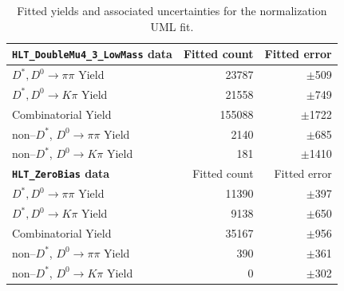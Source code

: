 \begin{table}[h!]
    \centering
    \begin{tabular}{@{}lrr@{}}
    \toprule
    \toprule
    \textbf{\texttt{HLT\_DoubleMu4\_3\_LowMass} data}& Fitted count & Fitted error  \\
    \midrule
    $D^*, D^0 \to \pi\pi$ Yield        & 23787 & $\pm$509 \\
    $D^*, D^0 \to K\pi$ Yield          & 21558  & $\pm$749 \\
    Combinatorial Yield               & 155088 & $\pm$1722 \\
    non--$D^*$, $D^0 \to \pi\pi$ Yield & 2140   & $\pm$685 \\
    non--$D^*$, $D^0 \to K\pi$ Yield   & 181     & $\pm$1410 \\
    \bottomrule
    \toprule
    \textbf{\texttt{HLT\_ZeroBias} data} & Fitted count & Fitted error \\
    \midrule
    $D^*, D^0 \to \pi\pi$ Yield        & 11390 & $\pm$397 \\
    $D^*, D^0 \to K\pi$ Yield          & 9138  & $\pm$650 \\
    Combinatorial Yield               & 35167 & $\pm$956 \\
    non--$D^*$, $D^0 \to \pi\pi$ Yield & 390   & $\pm$361 \\
    non--$D^*$, $D^0 \to K\pi$ Yield   & 0     & $\pm$302 \\
    \bottomrule
    \bottomrule
    \end{tabular}
    \caption{Fitted yields and associated uncertainties for the normalization UML fit.}
    \label{tab:d0pipi_uml_fit_results}
    \end{table}

